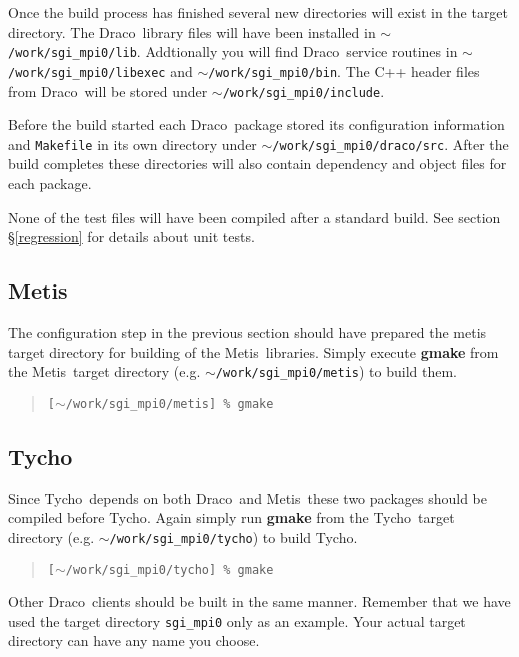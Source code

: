 \documentclass[11pt]{nmemo}
\newcommand{\comp}[1]{\normalfont\normalsize\texttt{#1}}
\newcommand{\draco}{{\normalfont\sffamily Draco}}
\newcommand{\tycho}{{\normalfont\sffamily Tycho}}
\newcommand{\metis}{{\normalfont\sffamily Metis}}
\begin{document}
Once the build process has finished several new directories will exist 
in the target directory.  The \draco\ library files will have been
installed in \comp{$\sim$/work/sgi\_mpi0/lib}.  Addtionally you will
find \draco\ service routines in \comp{$\sim$/work/sgi\_mpi0/libexec}
and \comp{$\sim$/work/sgi\_mpi0/bin}.  The C++ header files from
\draco\ will be stored under \comp{$\sim$/work/sgi\_mpi0/include}.

Before the build started each \draco\ package stored its configuration
information and \comp{Makefile} in its own directory under
\comp{$\sim$/work/sgi\_mpi0/draco/src}.  After the build completes
these directories will also contain dependency and object files for
each package.

None of the test files will have been compiled after a standard
build.  See section \S\ref{regression} for details about unit tests.

\subsection{\metis}

The configuration step in the previous section should have prepared
the metis target directory for building of the \metis\ libraries.
Simply execute \textbf{gmake} from the \metis\ target directory
(e.g. \comp{$\sim$/work/sgi\_mpi0/metis}) to build them.

\begin{verse}
\texttt{[$\sim$/work/sgi\_mpi0/metis] \% gmake}
\end{verse}

\subsection{\tycho}

Since \tycho\ depends on both \draco\ and \metis\ these two packages
should be compiled before \tycho.  Again simply run \textbf{gmake}
from the \tycho\ target directory (e.g. \comp{$\sim$/work/sgi\_mpi0/tycho})
to build \tycho.

\begin{verse}
\texttt{[$\sim$/work/sgi\_mpi0/tycho] \% gmake}
\end{verse}

Other \draco\ clients should be built in the same manner.  Remember
that we have used the target directory \comp{sgi\_mpi0} only as an
example.  Your actual target directory can have any name you choose.
\end{document}
